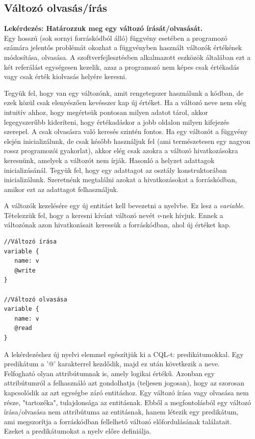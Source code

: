 \documentclass[a4paper,12pt]{report}
\begin{document}
\subsection{Változó olvasás/írás}
\textbf{Lekérdezés: Határozzuk meg egy változó írását/olvasását.}
\\
Egy hosszú (sok sornyi forráskódból álló) függvény esetében a programozó számára jelentős problémát okozhat a függvényben használt változók értékének módosítása, olvasása. A szoftverfejlesztésben alkalmazott eszközök általában ezt a két referálást egységesen kezelik, azaz a programozó nem képes csak értékadás vagy csak érték kiolvasás helyére keresni. 
\par Tegyük fel, hogy van egy változónk, amit rengetegszer használunk a kódban, de ezek közül csak elenyészően kevésszer kap új értéket. Ha a változó neve nem elég intuitív ahhoz, hogy megértsük pontosan milyen adatot tárol, akkor legegyszerűbb kideríteni, hogy értékadáskor a jobb oldalon milyen kifejezés szerepel. A csak olvasásra való keresés szintén fontos. Ha egy változót a függvény elején inicializálunk, de csak később használjuk fel (ami természetesen egy nagyon rossz programozói gyakorlat), akkor elég csak azokra a változó hivatkozásokra keresnünk, amelyek a változót nem írják. Hasonló a helyzet adattagok inicializásánál. Tegyük fel, hogy egy adattagot az osztály konstruktorában inicializálunk. Szeretnénk megtalálni azokat a hivatkozásokat a forráskódban, amikor ezt az adattagot felhasználjuk.
\par A változók kezelésére egy új entitást kell bevezetni a nyelvbe. Ez lesz a \textit{variable}. Tételezzük fel, hogy a keresni kívánt változó nevét \textit{v}-nek hívjuk. Ennek a változónak azon hivatkozásait keressük a forráskódban, ahol új értéket kap.
\begin{verbatim}
//Változó írása
variable {
   name: v
   @write
}

//Változó olvasása
variable {
   name: v
   @read
}
\end{verbatim}
\par A lekérdezéshez új nyelvi elemmel egészítjük ki a CQL-t: predikátumokkal. Egy predikátum a '@' karakterrel kezdődik, majd ez után következik a neve. Felfogható olyan attribútumnak is, amely logikai értékű. Azonban egy attribútumról a felhasználó azt gondolhatja (teljesen jogosan), hogy az szorosan kapcsolódik az azt egységbe záró entitáshoz. Egy változó írása vagy olvasása nem része, "tartozéka", tulajdonsága az entitásnak. Ebből a megfontolásból egy változó írása/olvasása nem attribútuma az entitásnak, hanem létezik egy predikátum, ami megszorítja a forráskódban fellelhető változó előfordulásának találatait. Ezeket a predikátumokat a nyelv előre definiálja.
\end{document}
